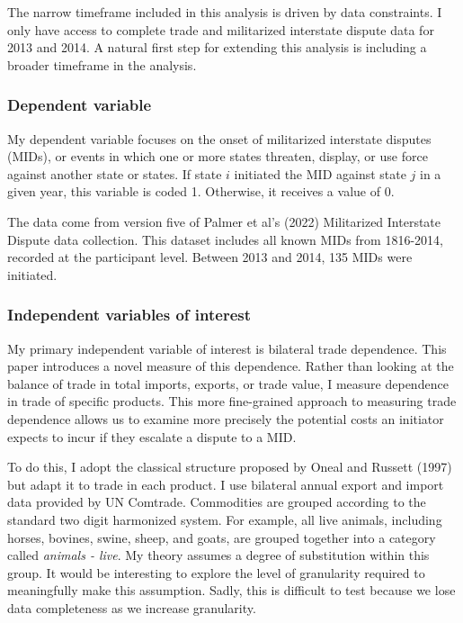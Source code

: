 \documentclass[
  letterpaper,
]{article}
\begin{document}
The narrow timeframe included in this analysis is driven by data
constraints. I only have access to complete trade and militarized
interstate dispute data for 2013 and 2014. A natural first step for
extending this analysis is including a broader timeframe in the
analysis.

\hypertarget{dependent-variable}{%
\subsubsection{Dependent variable}\label{dependent-variable}}

My dependent variable focuses on the onset of militarized interstate
disputes (MIDs), or events in which one or more states threaten,
display, or use force against another state or states. If state \(i\)
initiated the MID against state \(j\) in a given year, this variable is
coded 1. Otherwise, it receives a value of 0.

The data come from version five of Palmer et al's (2022) Militarized
Interstate Dispute data collection. This dataset includes all known MIDs
from 1816-2014, recorded at the participant level. Between 2013 and
2014, 135 MIDs were initiated.

\hypertarget{independent-variables-of-interest}{%
\subsubsection{Independent variables of
interest}\label{independent-variables-of-interest}}

My primary independent variable of interest is bilateral trade
dependence. This paper introduces a novel measure of this dependence.
Rather than looking at the balance of trade in total imports, exports,
or trade value, I measure dependence in trade of specific products. This
more fine-grained approach to measuring trade dependence allows us to
examine more precisely the potential costs an initiator expects to incur
if they escalate a dispute to a MID.

To do this, I adopt the classical structure proposed by Oneal and
Russett (1997) but adapt it to trade in each product. I use bilateral
annual export and import data provided by UN Comtrade. Commodities are
grouped according to the standard two digit harmonized system. For
example, all live animals, including horses, bovines, swine, sheep, and
goats, are grouped together into a category called \emph{animals -
live}. My theory assumes a degree of substitution within this group. It
would be interesting to explore the level of granularity required to
meaningfully make this assumption. Sadly, this is difficult to test
because we lose data completeness as we increase granularity.
\end{document}
